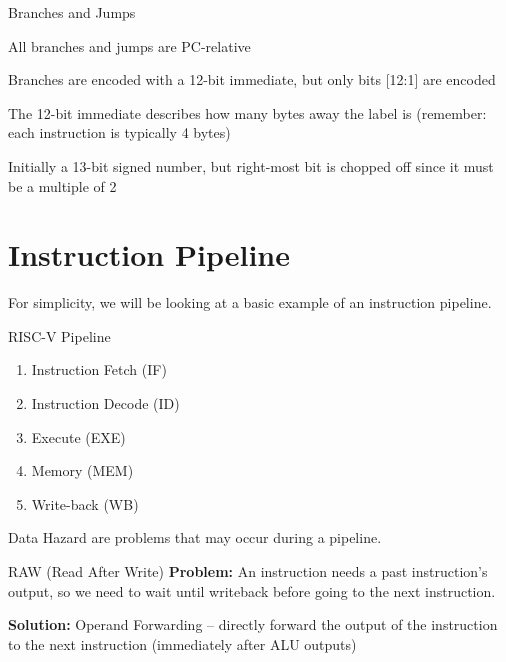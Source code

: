 \documentclass[12pt]{report}
\begin{document}
\begin{dfnbox}{Branches and Jumps}
	\begin{dfnitems}
		\item All branches and jumps are PC-relative
		\item Branches are encoded with a 12-bit immediate, but only bits [12:1] are encoded
		\item The 12-bit immediate describes how many bytes away the label is (remember: each instruction is typically 4 bytes)
		\item Initially a 13-bit signed number, but right-most bit is chopped off since it must be a multiple of 2
		\item 
	\end{dfnitems}
\end{dfnbox}

\newpage
\chapter{Instruction Pipeline}

For simplicity, we will be looking at a basic example of an instruction pipeline. 

\begin{genbox}{RISC-V Pipeline}
	\begin{enumerate}
		\item Instruction Fetch (IF)
		\item Instruction Decode (ID)
		\item Execute (EXE)
		\item Memory (MEM)
		\item Write-back (WB)
	\end{enumerate}
\end{genbox}

\begin{dfnbox}{Data Hazard}
	 are problems that may occur during a pipeline.
\end{dfnbox}

\begin{dfnbox}{RAW (Read After Write)}
	\textbf{Problem:} An instruction needs a past instruction's output, so we need to wait until writeback before going to the next instruction.
	
	\textbf{Solution:} Operand Forwarding -- directly forward the output of the instruction to the next instruction (immediately after ALU outputs)
\end{dfnbox}
\end{document}
